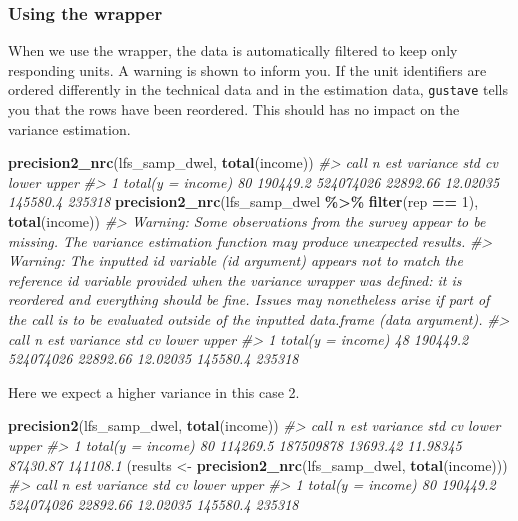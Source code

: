 \documentclass[
]{article}
\newenvironment{Shaded}{\begin{snugshade}}{\end{snugshade}}
\newcommand{\CommentTok}[1]{\textcolor[rgb]{0.56,0.35,0.01}{\textit{#1}}}
\newcommand{\DecValTok}[1]{\textcolor[rgb]{0.00,0.00,0.81}{#1}}
\newcommand{\FunctionTok}[1]{\textcolor[rgb]{0.13,0.29,0.53}{\textbf{#1}}}
\newcommand{\NormalTok}[1]{#1}
\newcommand{\OtherTok}[1]{\textcolor[rgb]{0.56,0.35,0.01}{#1}}
\newcommand{\SpecialCharTok}[1]{\textcolor[rgb]{0.81,0.36,0.00}{\textbf{#1}}}
\begin{document}
\subsubsection{Using the wrapper}\label{using-the-wrapper-1}

When we use the wrapper, the data is automatically filtered to keep only
responding units. A warning is shown to inform you. If the unit
identifiers are ordered differently in the technical data and in the
estimation data, \texttt{gustave} tells you that the rows have been
reordered. This should has no impact on the variance estimation.

\begin{Shaded}
\begin{Highlighting}[]
\FunctionTok{precision2\_nrc}\NormalTok{(lfs\_samp\_dwel, }\FunctionTok{total}\NormalTok{(income))}
\CommentTok{\#\textgreater{}                call  n      est  variance      std       cv    lower  upper}
\CommentTok{\#\textgreater{} 1 total(y = income) 80 190449.2 524074026 22892.66 12.02035 145580.4 235318}
\FunctionTok{precision2\_nrc}\NormalTok{(lfs\_samp\_dwel }\SpecialCharTok{\%\textgreater{}\%} \FunctionTok{filter}\NormalTok{(rep }\SpecialCharTok{==} \DecValTok{1}\NormalTok{), }\FunctionTok{total}\NormalTok{(income))}
\CommentTok{\#\textgreater{} Warning: Some observations from the survey appear to be missing. The variance estimation function may produce unexpected results.}
\CommentTok{\#\textgreater{} Warning: The inputted id variable (id argument) appears not to match the reference id variable provided when the variance wrapper was defined: it is reordered and everything should be fine. Issues may nonetheless arise if part of the call is to be evaluated outside of the inputted data.frame (data argument).}
\CommentTok{\#\textgreater{}                call  n      est  variance      std       cv    lower  upper}
\CommentTok{\#\textgreater{} 1 total(y = income) 48 190449.2 524074026 22892.66 12.02035 145580.4 235318}
\end{Highlighting}
\end{Shaded}

Here we expect a higher variance in this case 2.

\begin{Shaded}
\begin{Highlighting}[]
\FunctionTok{precision2}\NormalTok{(lfs\_samp\_dwel, }\FunctionTok{total}\NormalTok{(income))}
\CommentTok{\#\textgreater{}                call  n      est  variance      std       cv    lower    upper}
\CommentTok{\#\textgreater{} 1 total(y = income) 80 114269.5 187509878 13693.42 11.98345 87430.87 141108.1}
\NormalTok{(results }\OtherTok{\textless{}{-}} \FunctionTok{precision2\_nrc}\NormalTok{(lfs\_samp\_dwel, }\FunctionTok{total}\NormalTok{(income)))}
\CommentTok{\#\textgreater{}                call  n      est  variance      std       cv    lower  upper}
\CommentTok{\#\textgreater{} 1 total(y = income) 80 190449.2 524074026 22892.66 12.02035 145580.4 235318}
\end{Highlighting}
\end{Shaded}
\end{document}
